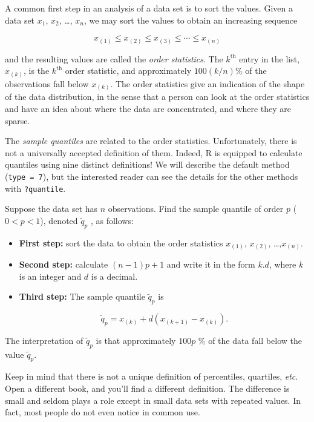 \documentclass[]{book}
\providecommand{\tightlist}{%
  \setlength{\itemsep}{0pt}\setlength{\parskip}{0pt}}
\numberwithin{equation}{chapter}
\numberwithin{figure}{chapter}
\theoremstyle{plain}
\theoremstyle{definition}
\theoremstyle{remark}
\theoremstyle{definition}
\theoremstyle{definition}
\theoremstyle{remark}
\begin{document}
A common first step in an analysis of a data set is to sort the values.
Given a data set \(x_{1}\), \(x_{2}\), \ldots{}, \(x_{n}\), we may sort
the values to obtain an increasing sequence

\begin{equation} 
x_{(1)}\leq x_{(2)}\leq x_{(3)}\leq\cdots\leq x_{(n)}
\end{equation}

and the resulting values are called the \emph{order statistics}. The
\(k^{\mathrm{th}}\) entry in the list, \(x_{(k)}\), is the
\(k^{\mathrm{th}}\) order statistic, and approximately \(100(k/n)\)\% of
the observations fall below \(x_{(k)}\). The order statistics give an
indication of the shape of the data distribution, in the sense that a
person can look at the order statistics and have an idea about where the
data are concentrated, and where they are sparse.

The \emph{sample quantiles} are related to the order statistics.
Unfortunately, there is not a universally accepted definition of them.
Indeed, R is equipped to calculate quantiles using nine distinct
definitions! We will describe the default method (\texttt{type\ =\ 7}),
but the interested reader can see the details for the other methods with
\texttt{?quantile}.

Suppose the data set has \(n\) observations. Find the sample quantile of
order \(p\) (\(0<p<1\)), denoted \(\tilde{q}_{p}\) , as follows:

\begin{itemize}
\tightlist
\item
  \textbf{First step:} sort the data to obtain the order statistics
  \(x_{(1)}\), \(x_{(2)}\), \ldots{},\(x_{(n)}\).
\item
  \textbf{Second step:} calculate \((n-1)p+1\) and write it in the form
  \(k.d\), where \(k\) is an integer and \(d\) is a decimal.
\item
  \textbf{Third step:} The sample quantile \(\tilde{q}_{p}\) is

  \begin{equation}
    \tilde{q}_{p}=x_{(k)}+d(x_{(k+1)}-x_{(k)}).
     \end{equation}
\end{itemize}

The interpretation of \(\tilde{q}_{p}\) is that approximately \(100p\)
\% of the data fall below the value \(\tilde{q}_{p}\).

Keep in mind that there is not a unique definition of percentiles,
quartiles, \emph{etc}. Open a different book, and you'll find a
different definition. The difference is small and seldom plays a role
except in small data sets with repeated values. In fact, most people do
not even notice in common use.
\end{document}
